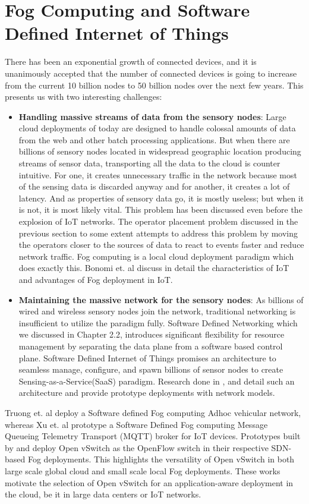 \section{Fog Computing and Software Defined Internet of Things}
There has been an exponential growth of connected devices, and it is unanimously accepted that the number of connected devices is going to increase from the current 10 billion nodes to 50 billion nodes over the next few years. This presents us with two interesting challenges: 
\begin{itemize}
\item \textbf{Handling massive streams of data from the sensory nodes}: Large cloud deployments of today are designed to handle colossal amounts of data from the web and other batch processing applications. But when there are billions of sensory nodes located in widespread geographic location producing streams of sensor data, transporting all the data to the cloud is counter intuitive. For one, it creates unnecessary traffic in the network because most of the sensing data is discarded anyway and for another, it creates a lot of latency. And as properties of sensory data go, it is mostly useless; but when it is not, it is most likely vital. This problem has been discussed even before the explosion of IoT networks. The operator placement problem discussed in the previous section to some extent attempts to address this problem by moving the operators closer to the sources of data to react to events faster and reduce network traffic. Fog computing is a local cloud deployment paradigm which does exactly this. Bonomi et. al \cite{bonomi2012fog} discuss in detail the characteristics of IoT and advantages of Fog deployment in IoT. 
\item \textbf{Maintaining the massive network for the sensory nodes}: As billions of wired and wireless sensory nodes join the network, traditional networking is insufficient to utilize the paradigm fully. Software Defined Networking which we discussed in Chapter 2.2, introduces significant flexibility for resource management by separating the data plane from a software based control plane. Software Defined Internet of Things promises an architecture to seamless manage, configure, and spawn billions of sensor nodes to create Sensing-as-a-Service(SaaS) paradigm. Research done in \cite{el2015software} , \cite{qin2014software} and \cite{flauzac2015sdn} detail such an architecture and provide prototype deployments with network models.
\end{itemize} 
Truong et. al \cite{truong2015software} deploy a Software defined Fog computing Adhoc vehicular network, whereas Xu et. al \cite{xu2016towards}  prototype a Software Defined Fog computing Message Queueing Telemetry Transport (MQTT) broker for IoT devices. Prototypes built by \cite{xu2016towards} and \cite{flauzac2015sdn} deploy Open vSwitch as the OpenFlow switch in their respective SDN-based Fog deployments. This highlights the versatility of Open vSwitch in both large scale global cloud and small scale local Fog deployments. These works motivate the selection of Open vSwitch for an application-aware deployment in the cloud, be it in large data centers or IoT networks.

